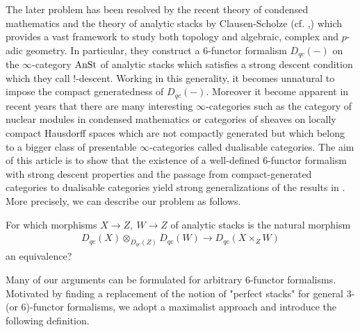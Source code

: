  The later problem has been resolved by the recent theory of condensed mathematics and the theory of analytic stacks by Clausen-Scholze (cf. \Cite{clausen2022condensed},\Cite{AnSt}) which provides a vast framework to study both topology and algebraic, complex and $p$-adic geometry. In particular, they construct a $6$-functor formalism $D_{qc}(-)$ on the $\infty$-category $\operatorname{AnSt}$ of analytic stacks which satisfies a strong descent condition which they call $!$-descent.
Working in this generality, it becomes unnatural to impose the compact generatedness of $D_{qc}(-)$.  Moreover it become apparent in recent years that  there are many interesting $\infty$-categories such as the category of nuclear modules in condensed mathematics or categories of sheaves on locally compact Hausdorff spaces which are not compactly generated but which belong to a bigger class of presentable $\infty$-categories called dualisable categories.  The aim of this article is to show that the existence of a well-defined $6$-functor formalism with strong descent properties and the passage from compact-generated categories to dualisable categories yield strong generalizations of the results in \Cite{ben2010integral}. \\

More precisely, we can describe our problem as follows.

\begin{Problem}\label{motivationquestion}
For which morphisms $X\to Z,\ W\to Z$  of analytic stacks is the natural morphism
\begin{align}
 D_{qc}(X)\otimes_{D_{qc}(Z)} D_{qc}(W) \to D_{qc}(X\times_Z W)
\end{align}
an equivalence?    
\end{Problem}

 
 
Many of our arguments can be formulated for arbitrary $6$-functor formalisms. Motivated by finding a replacement of the notion of "perfect stacks" for general $3$- (or $6$)-functor formalisms, we adopt a maximalist approach and introduce the following definition.

